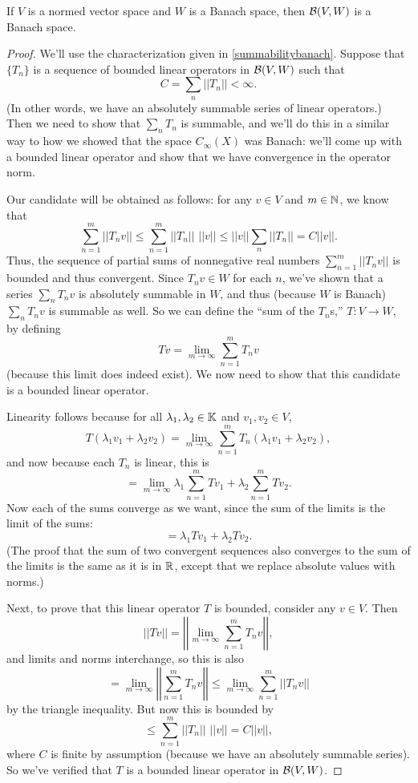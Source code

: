 \begin{theorem}\label{banachoperatorbanach}
If $V$ is a normed vector space and $W$ is a Banach space, then $\mathcal{B}(V, W)$ is a Banach space.
\end{theorem}
\begin{proof}
We'll use the characterization given in \cref{summabilitybanach}. Suppose that $\{T_n\}$ is a sequence of bounded linear operators in $\mathcal{B}(V, W)$ such that 
\[
    C = \sum_n ||T_n|| < \infty.
\]
(In other words, we have an absolutely summable series of linear operators.) Then we need to show that $\sum_n T_n$ is summable, and we'll do this in a similar way to how we showed that the space $C_{\infty}(X)$ was Banach: we'll come up with a bounded linear operator and show that we have convergence in the operator norm.

Our candidate will be obtained as follows: for any $v \in V$ and $m \in \mathbb N$, we know that
\[
    \sum_{n=1}^m ||T_nv|| \le \sum_{n=1}^m ||T_n|| \, \, ||v|| \le ||v|| \sum_{n} ||T_n|| = C||v||.
\]
Thus, the sequence of partial sums of nonnegative real numbers $\sum_{n=1}^m ||T_nv||$ is bounded and thus convergent. Since $T_nv \in W$ for each $n$, we've shown that a series $\sum_n T_n v$ is absolutely summable in $W$, and thus (because $W$ is Banach) $\sum_n T_n v$ is summable as well. So we can define the ``sum of the $T_n$s,'' $T: V \to W$, by defining
\[
    Tv = \lim_{m \to \infty} \sum_{n=1}^m T_nv
\]
(because this limit does indeed exist). We now need to show that this candidate is a bounded linear operator.

Linearity follows because for all $\lambda_1, \lambda_2 \in \mathbb K$ and $v_1, v_2 \in V$, 
\[
    T(\lambda_1 v_1 + \lambda_2 v_2) = \lim_{m \to \infty} \sum_{n=1}^m T_n(\lambda_1 v_1 + \lambda_2v_2),
\]
and now because each $T_n$ is linear, this is
\[
    = \lim_{m \to \infty} \lambda_1 \sum_{n=1}^m Tv_1 + \lambda_2 \sum_{n=1}^m Tv_2. 
\]  
Now each of the sums converge as we want, since the sum of the limits is the limit of the sums:
\[
    = \lambda_1 Tv_1 + \lambda_2 Tv_2.
\]
(The proof that the sum of two convergent sequences also converges to the sum of the limits is the same as it is in $\mathbb R$, except that we replace absolute values with norms.) 

Next, to prove that this linear operator $T$ is bounded, consider any $v \in V$. Then 
\[
    ||Tv|| = \left|\left|\lim_{m \to \infty} \sum_{n=1}^m T_n v\right|\right|,
\]
and limits and norms interchange, so this is also 
\[
    = \lim_{m \to \infty} \left|\left| \sum_{n=1}^m T_n v \right|\right| \le \lim_{m \to \infty} \sum_{n=1}^m ||T_n v||
\]
by the triangle inequality. But now this is bounded by 
\[
    \le \sum_{n=1}^m ||T_n|| \, \, ||v||= C||v||,
\]
where $C$ is finite by assumption (because we have an absolutely summable series). So we've verified that $T$ is a bounded linear operator in $\mathcal{B}(V, W)$.


\end{proof}

